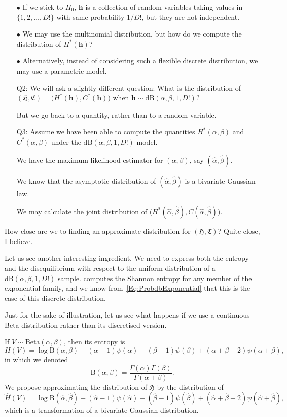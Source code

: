 \documentclass[12pt]{article}
\begin{document}
\begin{itemize}
\item[$\bullet$] If we stick to $H_0$, $\bm h$ is a collection of random variables taking values in $\{1, 2,\dots, D!\}$ with same probability $1/D!$, but they are not independent.
\item[$\bullet$] We may use the multinomial distribution, but how do we compute the distribution of $H^*(\bm h)$?
\item[$\bullet$] Alternatively, instead of considering such a flexible discrete distribution, we may use a parametric model.
\item[Q2:] We will ask a slightly different question: What is the distribution of $
(\mathfrak{H},\mathfrak{C}) = 
\big(H^*(\bm h),C^*(\bm h)\big)$ when $\bm h\sim\text{dB}(\alpha,\beta,1, D!)$?
\item[] But we go back to a quantity, rather than to a random variable.
\item[Q3:] Assume we have been able to compute the quantities $H^*(\alpha,\beta)$ and $C^*(\alpha,\beta)$ under the $\text{dB}(\alpha,\beta,1, D!)$ model.
\item[] We have the maximum likelihood estimator for $(\alpha,\beta)$, say $(\widehat\alpha,\widehat\beta)$.
\item[] We know that the asymptotic distribution of $(\widehat\alpha,\widehat\beta)$ is a bivariate Gaussian law.
\item[] We may calculate the joint distribution of $\big(H^*(\widehat\alpha, \widehat\beta) , C(\widehat\alpha, \widehat\beta)\big)$.
\end{itemize}
How close are we to finding an approximate distribution for $
(\mathfrak{H},\mathfrak{C})$?
Quite close, I believe.

Let us see another interesting ingredient.
We need to express both the entropy and the disequilibrium with respect to the uniform distribution of a $\text{dB}(\alpha,\beta,1,D!)$ sample.
\citet{ShannonsEntropyinExponentialFamiliesStatisticalApplications} computes the Shannon entropy for any member of the exponential family, and we know from~\eqref{Eq:ProbdbExponential} that this is the case of this discrete distribution.

Just for the sake of illustration, let us see what happens if we use a continuous Beta distribution rather than its discretised version.

If $V\sim\text{Beta}(\alpha,\beta)$, then its entropy is
\begin{equation}
H(V) = \log\text{B}(\alpha,\beta) -
(\alpha-1)\psi(\alpha) -(\beta-1) \psi(\beta) +(\alpha+\beta-2) \psi(\alpha+\beta),
\label{Eq:HBeta}
\end{equation}
in which we denoted
$$
\text{B}(\alpha,\beta) = \frac{\Gamma(\alpha)\Gamma(\beta)}{\Gamma(\alpha+\beta)}.
$$
We propose approximating the distribution of $\mathfrak{H}$ by the distribution of 
\begin{equation}
\widehat{H}(V)= \log\text{B}(\widehat\alpha,\widehat\beta) -
(\widehat\alpha-1)\psi(\widehat\alpha) -(\widehat\beta-1) \psi(\widehat\beta) +(\widehat\alpha+\widehat\beta-2) \psi(\widehat\alpha+\widehat\beta),
\end{equation}
which is a transformation of a bivariate Gaussian distribution.
\end{document}
